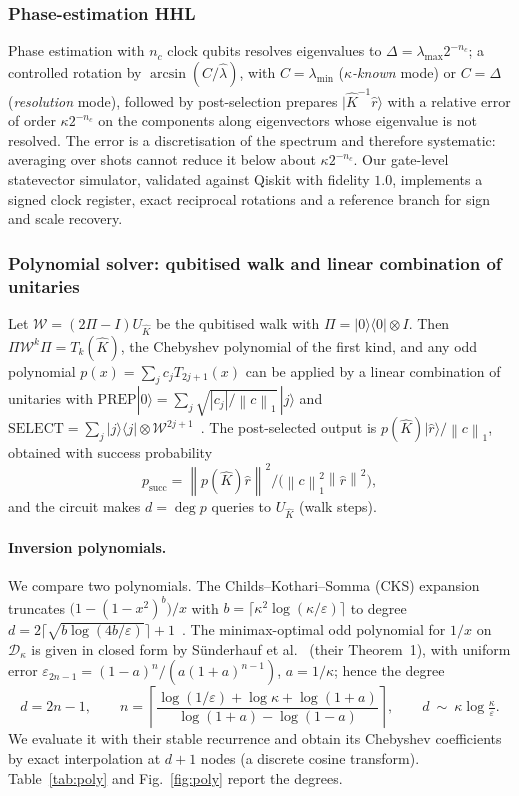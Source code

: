 \documentclass[11pt]{article}
\theoremstyle{definition}
\newcommand{\norm}[1]{\left\lVert #1 \right\rVert}
\newcommand{\Kh}{\hat K}
\newcommand{\eps}{\varepsilon}
\begin{document}
\subsubsection{Phase-estimation HHL}\label{sec:qhhl}
Phase estimation with $n_c$ clock qubits resolves eigenvalues to $\Delta=\lambda_{\max}2^{-n_c}$; a controlled rotation by $\arcsin(C/\hat\lambda)$, with $C=\lambda_{\min}$ (\emph{$\kappa$-known} mode) or $C=\Delta$ (\emph{resolution} mode), followed by post-selection prepares $|\Kh^{-1}\hat r\rangle$ with a relative error of order $\kappa2^{-n_c}$ on the components along eigenvectors whose eigenvalue is not resolved. The error is a discretisation of the spectrum and therefore systematic: averaging over shots cannot reduce it below about $\kappa2^{-n_c}$. Our gate-level statevector simulator, validated against Qiskit with fidelity $1.0$, implements a signed clock register, exact reciprocal rotations and a reference branch for sign and scale recovery.

\subsubsection{Polynomial solver: qubitised walk and linear combination of unitaries}\label{sec:qpolysolver}
Let $\mathcal W=(2\Pi-I)U_{\Kh}$ be the qubitised walk with $\Pi=|0\rangle\langle0|\otimes I$. Then $\Pi\mathcal W^k\Pi=T_k(\Kh)$, the Chebyshev polynomial of the first kind, and any odd polynomial $p(x)=\sum_jc_jT_{2j+1}(x)$ can be applied by a linear combination of unitaries with $\mathrm{PREP}|0\rangle=\sum_j\sqrt{|c_j|/\norm{c}_1}\,|j\rangle$ and $\mathrm{SELECT}=\sum_j|j\rangle\langle j|\otimes \mathcal W^{2j+1}$~\cite{childs2017quantum,gilyen2019qsvt}. The post-selected output is $p(\Kh)|\hat r\rangle/\norm{c}_1$, obtained with success probability
\begin{equation}\label{eq:psucc}
p_{\text{succ}}=\norm{p(\Kh)\hat r}^2\big/\big(\norm{c}_1^2\norm{\hat r}^2\big),
\end{equation}
and the circuit makes $d=\deg p$ queries to $U_{\Kh}$ (walk steps).

\paragraph{Inversion polynomials.} We compare two polynomials. The Childs--Kothari--Somma (CKS) expansion truncates $\big(1-(1-x^2)^b\big)/x$ with $b=\lceil\kappa^2\log(\kappa/\eps)\rceil$ to degree $d=2\lceil\sqrt{b\log(4b/\eps)}\rceil+1$~\cite{childs2017quantum}. The minimax-optimal odd polynomial for $1/x$ on $\mathcal D_\kappa$ is given in closed form by S\"underhauf et al.~\cite{sunderhauf2025polynomials} (their Theorem~1), with uniform error $\eps_{2n-1}=(1-a)^n/(a(1+a)^{n-1})$, $a=1/\kappa$; hence the degree
\begin{equation}\label{eq:optdeg}
d=2n-1,\qquad n=\left\lceil\frac{\log(1/\eps)+\log\kappa+\log(1+a)}{\log(1+a)-\log(1-a)}\right\rceil,\qquad d\ \sim\ \kappa\log\tfrac{\kappa}{\eps}.
\end{equation}
We evaluate it with their stable recurrence and obtain its Chebyshev coefficients by exact interpolation at $d+1$ nodes (a discrete cosine transform). Table~\ref{tab:poly} and Fig.~\ref{fig:poly} report the degrees.
\end{document}
